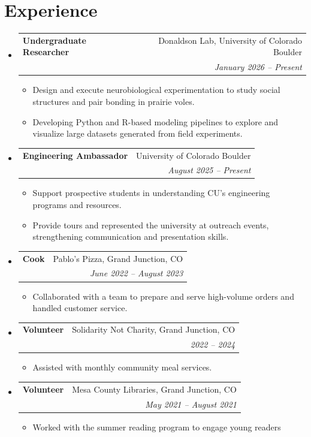 \documentclass[letterpaper,11pt]{article}
\makeatletter
\newcommand{\resumeItem}[1]{
  \item\small{
    {#1 \vspace{-2pt}}
  }
}
\newcommand{\resumeSubheading}[4]{
  \vspace{-2pt}\item
    \begin{tabular*}{0.97\textwidth}[t]{l@{\extracolsep{\fill}}r}
      \textbf{#1} & #2 \\
      \textit{\small#3} & \textit{\small #4} \\
    \end{tabular*}\vspace{-7pt}
}
\newcommand{\resumeProjectHeading}[2]{
    \item
    \begin{tabular*}{0.97\textwidth}{l@{\extracolsep{\fill}}r}
      \small#1 & #2 \\
    \end{tabular*}\vspace{-7pt}
}
\newcommand{\resumeSubHeadingListStart}{\begin{itemize}[leftmargin=0.15in, label={}]}
\newcommand{\resumeSubHeadingListEnd}{\end{itemize}}
\newcommand{\resumeItemListStart}{\begin{itemize}}
\newcommand{\resumeItemListEnd}{\end{itemize}\vspace{-5pt}}
\makeatother
\begin{document}
\section{Experience}
\resumeSubHeadingListStart

\resumeSubheading
{Undergraduate Researcher}{Donaldson Lab, University of Colorado Boulder}{}{January 2026 -- Present}
\resumeItemListStart
\resumeItem{Design and execute neurobiological experimentation to study social structures and pair bonding in prairie voles.}
\resumeItem{Developing Python and R-based modeling pipelines to explore and visualize large datasets generated from field experiments.}
\resumeItemListEnd

\resumeSubheading
{Engineering Ambassador}{University of Colorado Boulder}
{}{August 2025 -- Present}
\resumeItemListStart
\resumeItem{Support prospective students in understanding CU’s engineering programs and resources.}
\resumeItem{Provide tours and represented the university at outreach events, strengthening communication and presentation skills.}
\resumeItemListEnd

\resumeSubheading
{Cook}{Pablo's Pizza, Grand Junction, CO}
{}{June 2022 -- August 2023}
\resumeItemListStart
\resumeItem{Collaborated with a team to prepare and serve high-volume orders and handled customer service.}
\resumeItemListEnd

\resumeSubheading
{Volunteer}{Solidarity Not Charity, Grand Junction, CO}
{}{2022 -- 2024}
\resumeItemListStart
\resumeItem{Assisted with monthly community meal services.}
\resumeItemListEnd

\resumeSubheading
{Volunteer}{Mesa County Libraries, Grand Junction, CO}
{}{May 2021 -- August 2021}
\resumeItemListStart
\resumeItem{Worked with the summer reading program to engage young readers}
\resumeItemListEnd

\resumeSubHeadingListEnd


\end{document}
